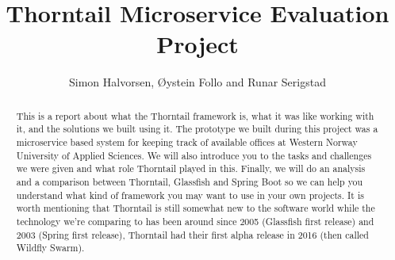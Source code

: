 \documentclass[11pt]{article}
\begin{document}
\title{Thorntail Microservice Evaluation Project}

\author{Simon Halvorsen, Øystein Follo and Runar Serigstad}

\maketitle
\frontmatter
\begin{abstract}

\noindent This is a report about what the Thorntail framework is, what it was like working with it, and the solutions we built using it. The prototype we built during this project was a microservice based system for keeping track of available offices at Western Norway University of Applied Sciences. We will also introduce you to the tasks and challenges we were given and what role Thorntail played in this. Finally, we will do an analysis and a comparison between Thorntail, Glassfish and Spring Boot so we can help you understand what kind of framework you may want to use in your own projects. It is worth mentioning that Thorntail is still somewhat new to the software world while the technology we’re comparing to has been around since 2005 (Glassfish first release) and 2003 (Spring first release), Thorntail had their first alpha release in 2016 (then called Wildfly Swarm).

\thispagestyle{empty}
  
\end{abstract}

\newpage
\tableofcontents
\thispagestyle{empty}
\newpage
%
\setcounter{page}{1}

\newpage

\newpage

\newpage



\newpage

{}
\end{document}
